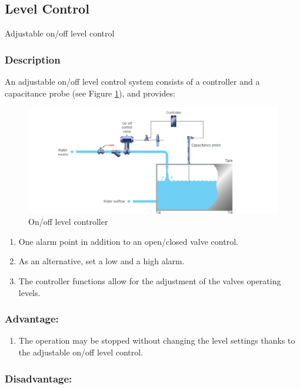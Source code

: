 \subsection{Level Control}

Adjustable on/off level control

\subsubsection{Description}

An adjustable on/off level control system consists of a controller and a
capacitance probe (see Figure \ref{fig:On/offlevelcontroller}), and provides:

\begin{figure}[h!]
  \centering
  \includegraphics[width=0.8\linewidth]{figs/control_instrumentation/image5.png}
  \caption{On/off level controller}
  \label{fig:On/offlevelcontroller}
\end{figure}

\begin{enumerate}
\item
  One alarm point in addition to an open/closed valve control.
\item
  As an alternative, set a low and a high alarm.
\item
  The controller functions allow for the adjustment of the
  valve\textquotesingle s operating levels.
\end{enumerate}

\subsubsection{Advantage:}

\begin{enumerate}
\item
  The operation may be stopped without changing the level settings
  thanks to the adjustable on/off level control.
\end{enumerate}

\subsubsection{Disadvantage:}

